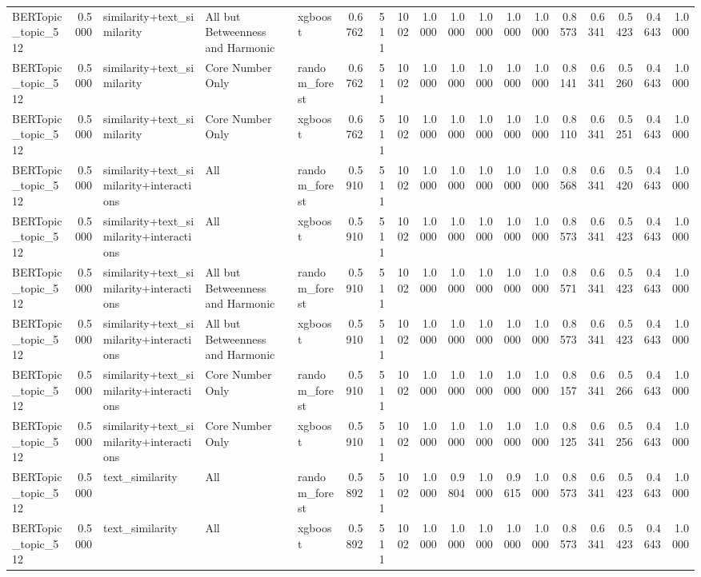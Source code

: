 \begin{tabular}{lrlllrrrrrrrrrrrrr}
BERTopic_topic_512 & 0.5000 & similarity+text_similarity & All but Betweenness and Harmonic & xgboost & 0.6762 & 511 & 1002 & 1.0000 & 1.0000 & 1.0000 & 1.0000 & 1.0000 & 0.8573 & 0.6341 & 0.5423 & 0.4643 & 1.0000 \\
BERTopic_topic_512 & 0.5000 & similarity+text_similarity & Core Number Only & random_forest & 0.6762 & 511 & 1002 & 1.0000 & 1.0000 & 1.0000 & 1.0000 & 1.0000 & 0.8141 & 0.6341 & 0.5260 & 0.4643 & 1.0000 \\
BERTopic_topic_512 & 0.5000 & similarity+text_similarity & Core Number Only & xgboost & 0.6762 & 511 & 1002 & 1.0000 & 1.0000 & 1.0000 & 1.0000 & 1.0000 & 0.8110 & 0.6341 & 0.5251 & 0.4643 & 1.0000 \\
BERTopic_topic_512 & 0.5000 & similarity+text_similarity+interactions & All & random_forest & 0.5910 & 511 & 1002 & 1.0000 & 1.0000 & 1.0000 & 1.0000 & 1.0000 & 0.8568 & 0.6341 & 0.5420 & 0.4643 & 1.0000 \\
BERTopic_topic_512 & 0.5000 & similarity+text_similarity+interactions & All & xgboost & 0.5910 & 511 & 1002 & 1.0000 & 1.0000 & 1.0000 & 1.0000 & 1.0000 & 0.8573 & 0.6341 & 0.5423 & 0.4643 & 1.0000 \\
BERTopic_topic_512 & 0.5000 & similarity+text_similarity+interactions & All but Betweenness and Harmonic & random_forest & 0.5910 & 511 & 1002 & 1.0000 & 1.0000 & 1.0000 & 1.0000 & 1.0000 & 0.8571 & 0.6341 & 0.5423 & 0.4643 & 1.0000 \\
BERTopic_topic_512 & 0.5000 & similarity+text_similarity+interactions & All but Betweenness and Harmonic & xgboost & 0.5910 & 511 & 1002 & 1.0000 & 1.0000 & 1.0000 & 1.0000 & 1.0000 & 0.8573 & 0.6341 & 0.5423 & 0.4643 & 1.0000 \\
BERTopic_topic_512 & 0.5000 & similarity+text_similarity+interactions & Core Number Only & random_forest & 0.5910 & 511 & 1002 & 1.0000 & 1.0000 & 1.0000 & 1.0000 & 1.0000 & 0.8157 & 0.6341 & 0.5266 & 0.4643 & 1.0000 \\
BERTopic_topic_512 & 0.5000 & similarity+text_similarity+interactions & Core Number Only & xgboost & 0.5910 & 511 & 1002 & 1.0000 & 1.0000 & 1.0000 & 1.0000 & 1.0000 & 0.8125 & 0.6341 & 0.5256 & 0.4643 & 1.0000 \\
BERTopic_topic_512 & 0.5000 & text_similarity & All & random_forest & 0.5892 & 511 & 1002 & 1.0000 & 0.9804 & 1.0000 & 0.9615 & 1.0000 & 0.8573 & 0.6341 & 0.5423 & 0.4643 & 1.0000 \\
BERTopic_topic_512 & 0.5000 & text_similarity & All & xgboost & 0.5892 & 511 & 1002 & 1.0000 & 1.0000 & 1.0000 & 1.0000 & 1.0000 & 0.8573 & 0.6341 & 0.5423 & 0.4643 & 1.0000 \\

\end{tabular}
